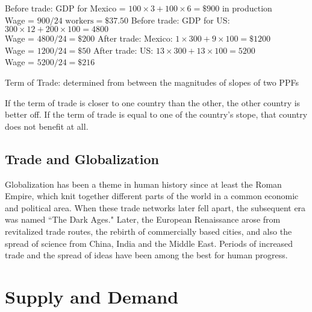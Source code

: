 \documentclass[12pt]{article}
\begin{document}
\noindent Before trade: GDP for Mexico = $100 \times 3 + 100 \times 6 = \$900$ in production \\ Wage = $900/24 \text{ workers} = \$37.50$ 
Before trade: GDP for US: $300 \times 12 + 200 \times 100 = 4800$ \\ Wage = $4800 /24 = \$200$ 
After trade: Mexico: $1 \times 300 + 9 \times 100 = \$1200$ \\ Wage = $1200/24 = \$50$
After trade: US: $ 13 \times 300 + 13 \times 100 =  5200$ \\ Wage = $ 5200 / 24 = \$216 $ 
\begin{definition} Term of Trade: determined from between the magnitudes of slopes of two PPFs \end{definition}
If the term of trade is closer to one country than the other, the other country is better off. If the term of trade is equal to one of the country's stope, that country does not benefit at all. 

\subsection{Trade and Globalization}
Globalization has been a theme in human history since at least the Roman Empire, which knit together different parts of the world in a common economic and political area. When these trade networks later fell apart, the subsequent era was named ``The Dark Ages." Later, the European Renaissance arose from revitalized trade routes, the rebirth of commercially based cities, and also the spread of science from China, India and the Middle East. Periods of increased trade and the spread of ideas have been among the best for human progress. 


\section{Supply and Demand}
\end{document}
